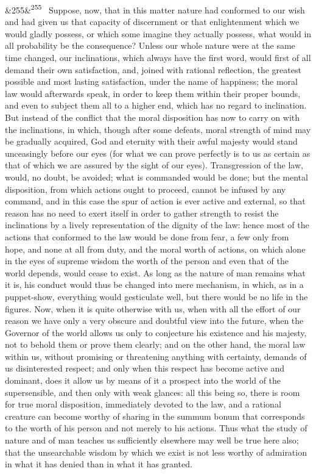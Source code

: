 \documentclass[12pt]{article}
\newcommand{\para}[1][]{\par\noindent\ifx&#1&\else\textsuperscript{\footnotesize #1}~\fi}
\begin{document}
\para[255] Suppose, now, that in this matter nature had conformed to our wish and had given us that capacity of discernment or that enlightenment which we would gladly possess, or which some imagine they actually possess, what would in all probability be the consequence? Unless our whole nature were at the same time changed, our inclinations, which always have the first word, would first of all demand their own satisfaction, and, joined with rational reflection, the greatest possible and most lasting satisfaction, under the name of happiness; the moral law would afterwards speak, in order to keep them within their proper bounds, and even to subject them all to a higher end, which has no regard to inclination. But instead of the conflict that the moral disposition has now to carry on with the inclinations, in which, though after some defeats, moral strength of mind may be gradually acquired, God and eternity with their awful majesty would stand unceasingly before our eyes (for what we can prove perfectly is to us as certain as that of which we are assured by the sight of our eyes). Transgression of the law, would, no doubt, be avoided; what is commanded would be done; but the mental disposition, from which actions ought to proceed, cannot be infused by any command, and in this case the spur of action is ever active and external, so that reason has no need to exert itself in order to gather strength to resist the inclinations by a lively representation of the dignity of the law: hence most of the actions that conformed to the law would be done from fear, a few only from hope, and none at all from duty, and the moral worth of actions, on which alone in the eyes of supreme wisdom the worth of the person and even that of the world depends, would cease to exist. As long as the nature of man remains what it is, his conduct would thus be changed into mere mechanism, in which, as in a puppet-show, everything would gesticulate well, but there would be no life in the figures. Now, when it is quite otherwise with us, when with all the effort of our reason we have only a very obscure and doubtful view into the future, when the Governor of the world allows us only to conjecture his existence and his majesty, not to behold them or prove them clearly; and on the other hand, the moral law within us, without promising or threatening anything with certainty, demands of us disinterested respect; and only when this respect has become active and dominant, does it allow us by means of it a prospect into the world of the supersensible, and then only with weak glances: all this being so, there is room for true moral disposition, immediately devoted to the law, and a rational creature can become worthy of sharing in the summum bonum that corresponds to the worth of his person and not merely to his actions. Thus what the study of nature and of man teaches us sufficiently elsewhere may well be true here also; that the unsearchable wisdom by which we exist is not less worthy of admiration in what it has denied than in what it has granted.
\end{document}
